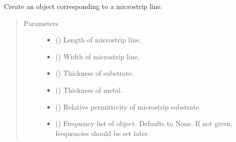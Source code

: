 \documentclass[letterpaper,10pt,english]{sphinxmanual}
\begin{document}
\begin{fulllineitems}
\begin{fulllineitems}
\begin{quote}
\begin{description}
\end{description}\end{quote}

\end{fulllineitems}


\begin{fulllineitems}
\label{\detokenize{touchstone:touchstone.spfile.microstripline}}
Create an  object corresponding to a microstrip line.
\begin{quote}\begin{description}
\item[{Parameters}] \leavevmode\begin{itemize}
\item {} 
 () \textendash{} Length of microstrip line.

\item {} 
 () \textendash{} Width of microstrip line.

\item {} 
 () \textendash{} Thickness of substrate.

\item {} 
 () \textendash{} Thickness of metal.

\item {} 
 () \textendash{} Relative permittivity of microstrip substrate.

\item {} 
 (\sphinxstyleliteralemphasis{\sphinxupquote{, }}) \textendash{} Frequency list of object. Defaults to None. If not given, frequencies should be set later.


\end{itemize}
\end{description}
\end{quote}
\end{fulllineitems}
\end{fulllineitems}
\end{document}
